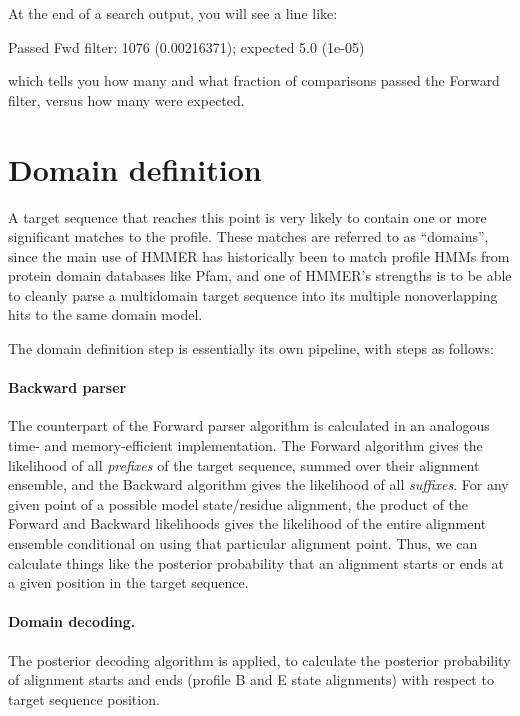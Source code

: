 At the end of a search output, you will see a line like:

\begin{sreoutput}
Passed Fwd filter:                      1076  (0.00216371); expected 5.0 (1e-05)
\end{sreoutput}

which tells you how many and what fraction of comparisons passed the
Forward filter, versus how many were expected.


\section{Domain definition}

A target sequence that reaches this point is very likely to contain
one or more significant matches to the profile. These matches are
referred to as ``domains'', since the main use of HMMER has
historically been to match profile HMMs from protein domain databases
like Pfam, and one of HMMER's strengths is to be able to cleanly parse
a multidomain target sequence into its multiple nonoverlapping hits to
the same domain model.

The domain definition step is essentially its own pipeline, with steps
as follows:

\paragraph{Backward parser}
The counterpart of the Forward parser algorithm is calculated in an
analogous time- and memory-efficient implementation. The Forward
algorithm gives the likelihood of all \emph{prefixes} of the target
sequence, summed over their alignment ensemble, and the Backward
algorithm gives the likelihood of all \emph{suffixes}. For any given
point of a possible model state/residue alignment, the product of the
Forward and Backward likelihoods gives the likelihood of the entire
alignment ensemble conditional on using that particular alignment
point. Thus, we can calculate things like the posterior probability
that an alignment starts or ends at a given position in the target
sequence.

\paragraph{Domain decoding.}
The posterior decoding algorithm is applied, to calculate the
posterior probability of alignment starts and ends (profile B and E
state alignments) with respect to target sequence position.

